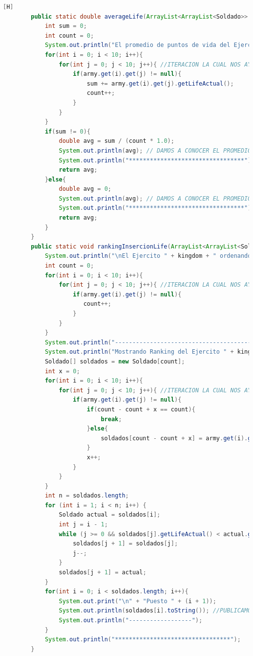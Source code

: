 \documentclass{article}
\begin{document}
	\begin{lstlisting}[language=java,caption={Las lineas de codigos de la clase Mapa creada:}][H]
		public static double averageLife(ArrayList<ArrayList<Soldado>> army , String kingdom){
			int sum = 0;
			int count = 0;
			System.out.println("El promedio de puntos de vida del Ejercito " + kingdom + " es: ");
			for(int i = 0; i < 10; i++){
				for(int j = 0; j < 10; j++){ //ITERACION LA CUAL NOS AYUDA A PASAR POR TODOS LOS SOLDADOS DE CADA EJERCITO
					if(army.get(i).get(j) != null){ 
						sum += army.get(i).get(j).getLifeActual();
						count++;
					}
				}
			}
			if(sum != 0){
				double avg = sum / (count * 1.0);
				System.out.println(avg); // DAMOS A CONOCER EL PROMEDIO DE VIDA DE CADA EJERCITO 
				System.out.println("*********************************");
				return avg;
			}else{
				double avg = 0;
				System.out.println(avg); // DAMOS A CONOCER EL PROMEDIO DE VIDA DE CADA EJERCITO 
				System.out.println("*********************************");
				return avg;
			}
		}
		public static void rankingInsercionLife(ArrayList<ArrayList<Soldado>> army , String kingdom){
			System.out.println("\nEl Ejercito " + kingdom + " ordenando por metodo insercion: ");
			int count = 0;
			for(int i = 0; i < 10; i++){
				for(int j = 0; j < 10; j++){ //ITERACION LA CUAL NOS AYUDA A PASAR POR TODOS LOS SOLDADOS DE CADA EJERCITO
					if(army.get(i).get(j) != null){ 
					   count++;
					}
				}
			}
			System.out.println("------------------------------------------");
			System.out.println("Mostrando Ranking del Ejercito " + kingdom + " ..... ////// --->");
			Soldado[] soldados = new Soldado[count];
			int x = 0;
			for(int i = 0; i < 10; i++){
				for(int j = 0; j < 10; j++){ //ITERACION LA CUAL NOS AYUDA A PASAR POR TODOS LOS SOLDADOS AL ARRAY SOLDADO PARA PODER USAR EL USO DEL METODO DE ORDENACION INSERCION
					if(army.get(i).get(j) != null){ 
						if(count - count + x == count){
							break;
						}else{
							soldados[count - count + x] = army.get(i).get(j); //LA MISMA LOGICA QUE EL ANTERIOR METODO SOLO QUE EN ESTE LO USARIAMOS DE MANERA DIFERENTE YA QUE ESTE SERIA DE FORMA DE INSERCION
						}
						x++;   
					}
				}
			}
			int n = soldados.length;
			for (int i = 1; i < n; i++) {
				Soldado actual = soldados[i];
				int j = i - 1;
				while (j >= 0 && soldados[j].getLifeActual() < actual.getLifeActual()) { //ORDENAMOS EL EJERCITO RESPECTIVAMENTE MEDIANTE EL METODO QUE NOS OFRECE INSERCION EL CUAL ES ESTE CODIGO
					soldados[j + 1] = soldados[j];
					j--;
				}
				soldados[j + 1] = actual;
			}
			for(int i = 0; i < soldados.length; i++){
				System.out.print("\n" + "Puesto " + (i + 1));
				System.out.println(soldados[i].toString()); //PUBLICAMOS RESULTADOS
				System.out.println("------------------");
			}
			System.out.println("*********************************");
		}
	\end{lstlisting}
\end{document}

